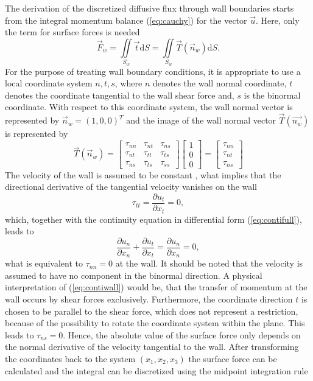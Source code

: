 The derivation of the discretized diffusive flux through wall boundaries starts from the integral momentum balance (\ref{eq:cauchy}) for the vector \(\vec{u}\). Here, only the term for surface forces is needed
\begin{displaymath}
  \vec{F}_w =  \iint\limits_{S_w} \vec{t} \mathrm{d}S = \iint\limits_{S_w} \vec{T}(\vec{n}_w) \mathrm{d}S.
\end{displaymath}
For the purpose of treating wall boundary conditions, it is appropriate to use a local coordinate system \(n,t,s\), where \(n\) denotes the wall normal coordinate, \(t\) denotes the coordinate tangential to the wall shear force and, \(s\) is the binormal coordinate. With respect to this coordinate system, the wall normal vector is represented by \(\vec{n}_w = \left( 1, 0 , 0 \right)^T\) and the image of the wall normal vector \(\vec{T}(\vec{n_w})\) is represented by 
\begin{displaymath}
\vec{T}(\vec{n}_w) =
\left[
  \begin{array}{ccc}
    \tau_{nn} & \tau_{nt} & \tau_{ns}\\
    \tau_{nt} & \tau_{tt} & \tau_{ts}\\
    \tau_{ns} & \tau_{ts} & \tau_{ss}
  \end{array}
\right]
\left[
\begin{array}{c}
  1\\
  0\\
  0
\end{array}
\right]
=
\left[
\begin{array}{c}
  \tau_{nn}\\
  \tau_{nt}\\
  \tau_{ns}
\end{array}
\right]
\end{displaymath}
The velocity of the wall is assumed to be constant \cite{schaefer99}, what implies that the directional derivative of the tangential velocity vanishes on the wall
\begin{displaymath}
  \tau_{tt} =  \frac{ \partial u_t }{ \partial x_t }  =  0,
\end{displaymath}
which, together with the continuity equation in differential form (\ref{eq:contifull}), leads to
\begin{equation}
  \label{eq:contiwall}
 \frac{ \partial u_n }{ \partial x_n } + \frac{ \partial u_t }{ \partial x_t } =  \frac{ \partial u_n }{ \partial x_n } = 0,
\end{equation}
what is equivalent to \( \tau_{nn} = 0\) at the wall. It should be noted that the velocity is assumed to have no component in the binormal direction. A physical interpretation of (\ref{eq:contiwall}) would be, that the transfer of momentum at the wall occurs by shear forces exclusively. Furthermore, the coordinate direction \(t\) is chosen to be parallel to the shear force, which does not represent a restriction, because of the possibility to rotate the coordinate system within the plane. This leads to \( \tau_{ns} = 0 \). Hence, the absolute value of the surface force only depends on the normal derivative of the velocity tangential to the wall. After transforming the coordinates back to the system \((x_1, x_2, x_3)\) the surface force can be calculated and the integral can be discretized using the midpoint integration rule 
